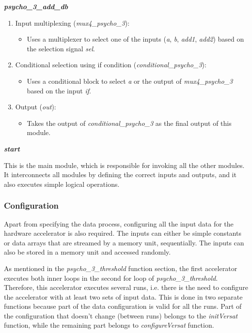 \vspace{0.5cm}

\textbf{\textit{psycho\_3\_add\_db}}

\begin{enumerate}

\item Input multiplexing (\textit{mux4\_psycho\_3}):
\begin{itemize}
\item Uses a multiplexer to select one of the inputs (\textit{a}, \textit{b}, \textit{add1}, \textit{add2}) based on the selection signal \textit{sel}.
\end{itemize}

\item Conditional selection using if condition (\textit{conditional\_psycho\_3}):
\begin{itemize}
\item Uses a conditional block to select \textit{a} or the output of \textit{mux4\_psycho\_3} based on the input \textit{if}.
\end{itemize}

\item Output (\textit{out}):
\begin{itemize}
\item Takes the output of \textit{conditional\_psycho\_3} as the final output of this module.
\end{itemize}

\end{enumerate}

\vspace{0.5cm}

\textbf{\textit{start}}

This is the main module, which is responsible for invoking all the other modules. It interconnects all modules by defining the correct inputs and outputs, and it also executes simple logical operations.


\subsubsection{Configuration}
Apart from specifying the data process, configuring all the input data for the hardware accelerator is also required. The inputs can either be simple constants or data arrays that are streamed by a memory unit, sequentially. The inputs can also be stored in a memory unit and accessed randomly.

As mentioned in the \textit{psycho\_3\_threshold} function section, the first accelerator executes both inner loops in the second for loop of \textit{psycho\_3\_threshold}.
Therefore, this accelerator executes several runs, i.e. there is the need to configure the accelerator with at least two sets of input data.
This is done in two separate functions because part of the data configuration is valid for all the runs. Part of the configuration that doesn't change (between runs) belongs to the \textit{initVersat} function, while the remaining part belongs to \textit{configureVersat} function.

